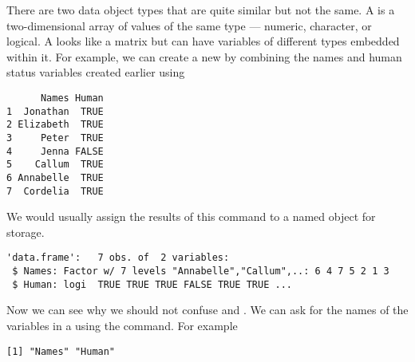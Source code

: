 There are two data object types that are quite similar but not the same. A  is a two-dimensional array of values of the same type --- numeric, character, or logical. A  looks like a matrix but can have variables of different types embedded within it. For example, we can create a new  by combining the names and human status variables created earlier using 
\begin{knitrout}
\color{fgcolor}\begin{kframe}
\begin{alltt}
\hlstd{> }
\end{alltt}
\begin{verbatim}
      Names Human
1  Jonathan  TRUE
2 Elizabeth  TRUE
3     Peter  TRUE
4     Jenna FALSE
5    Callum  TRUE
6 Annabelle  TRUE
7  Cordelia  TRUE
\end{verbatim}
\end{kframe}
\end{knitrout}
We would usually assign the results of this command to a named object for storage. 
\begin{knitrout}
\color{fgcolor}\begin{kframe}
\begin{alltt}
\hlstd{> } \hlkwb{=} 
\hlstd{> }
\end{alltt}
\begin{verbatim}
'data.frame':	7 obs. of  2 variables:
 $ Names: Factor w/ 7 levels "Annabelle","Callum",..: 6 4 7 5 2 1 3
 $ Human: logi  TRUE TRUE TRUE FALSE TRUE TRUE ...
\end{verbatim}
\end{kframe}
\end{knitrout}
 
Now we can see why we should not confuse  and . We can ask for the names of the variables in a  using the  command. For example 
\begin{knitrout}
\color{fgcolor}\begin{kframe}
\begin{alltt}
\hlstd{> }
\end{alltt}
\begin{verbatim}
[1] "Names" "Human"
\end{verbatim}
\end{kframe}
\end{knitrout}
 
